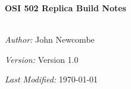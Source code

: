 \begin{titlepage}
\vbox{ }

\vbox{ }

\begin{center}

\\[1cm]

\textsc{\Large }\\[0.5cm]

\vbox{ }

\HRule \\[0.4cm]
{ \huge \bfseries OSI 502 Replica Build Notes}\\[0.0cm]
\HRule \\[0.5cm]

\begin{minipage}{0.4\textwidth}
\begin{flushleft} \large
\emph{Author:} John Newcombe
\end{flushleft}
\end{minipage}
\begin{minipage}{0.4\textwidth}
\begin{flushright} \large
\emph{Version:} Version 1.0
\end{flushright}
\end{minipage}
\vfill

\emph{Last Modified:} \large{\today}
\end{center}
\end{titlepage}

